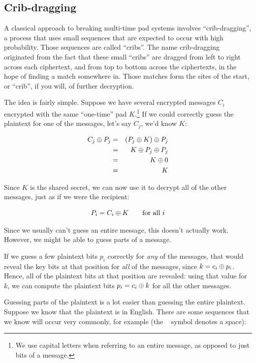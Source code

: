 \documentclass[11pt,ebook,table,dvipsnames]{memoir}
\begin{document}
\subsection{Crib-dragging}
\label{sec-2-1-5-3}

A classical approach to breaking multi-time pad systems involves
\enquote{crib-dragging}, a process that uses small sequences that are expected
to occur with high probability. Those sequences are called \enquote{cribs}.
The name crib-dragging originated from the fact that these small
\enquote{cribs} are dragged from left to right across each ciphertext, and
from top to bottom across the ciphertexts, in the hope of finding a
match somewhere in. Those matches form the sites of the start, or
\enquote{crib}, if you will, of further decryption.

The idea is fairly simple. Suppose we have several encrypted messages
$C_i$ encrypted with the same \enquote{one-time} pad $K$.\footnote{We use capital
letters when referring to an entire message, as opposed to just bits
of a message.} If we could correctly guess the plaintext for one of
the messages, let's say $C_j$, we'd know $K$:

\begin{eqnarray*}
C_j \oplus P_j
&=& (P_j \oplus K) \oplus P_j \\
&=& K \oplus P_j \oplus P_j \\
&=& K \oplus 0 \\
&=& K
\end{eqnarray*}

Since $K$ is the shared secret, we can now use it to decrypt all of
the other messages, just as if we were the recipient:

\[
P_i = C_i \oplus K \qquad \text{for all }i
\]

Since we usually can't guess an entire message, this doesn't actually
work. However, we might be able to guess parts of a message.

If we guess a few plaintext bits $p_i$ correctly for \emph{any} of the
messages, that would reveal the key bits at that position for \emph{all} of
the messages, since $k = c_i \oplus p_i$. Hence, all of the plaintext
bits at that position are revealed: using that value for $k$, we can
compute the plaintext bits $p_i = c_i \oplus k$ for all the other
messages.

Guessing parts of the plaintext is a lot easier than guessing the
entire plaintext. Suppose we know that the plaintext is in English.
There are some sequences that we know will occur very commonly, for
example (the \verb*| | symbol denotes a space):
\end{document}
